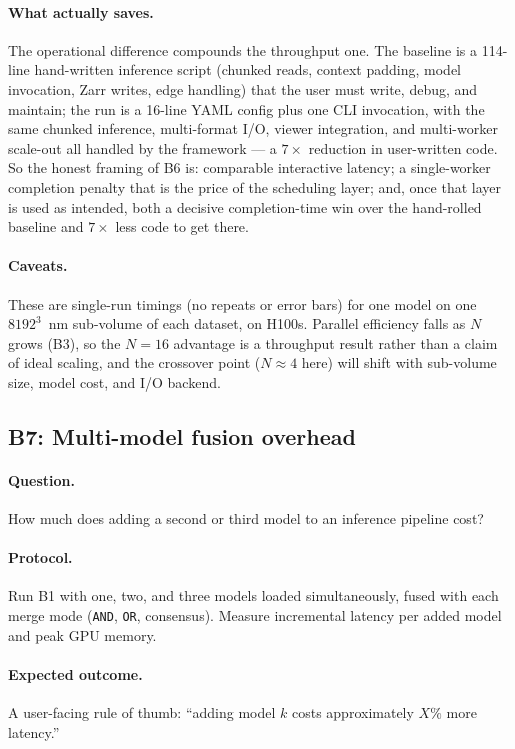 \paragraph{What \cellmapflow{} actually saves.} The operational difference compounds the throughput one. The baseline is a 114-line hand-written inference script (chunked reads, context padding, model invocation, Zarr writes, edge handling) that the user must write, debug, and maintain; the \cellmapflow{} run is a 16-line YAML config plus one CLI invocation, with the same chunked inference, multi-format I/O, viewer integration, and multi-worker scale-out all handled by the framework --- a $7\times$ reduction in user-written code. So the honest framing of B6 is: comparable interactive latency; a single-worker completion penalty that is the price of the scheduling layer; and, once that layer is used as intended, both a decisive completion-time win over the hand-rolled baseline and $7\times$ less code to get there.

\paragraph{Caveats.} These are single-run timings (no repeats or error bars) for one model on one $8192^3$~nm sub-volume of each dataset, on H100s. Parallel efficiency falls as $N$ grows (B3), so the $N{=}16$ advantage is a throughput result rather than a claim of ideal scaling, and the crossover point ($N{\approx}4$ here) will shift with sub-volume size, model cost, and I/O backend.

\subsection*{B7: Multi-model fusion overhead}

\paragraph{Question.} How much does adding a second or third model to an inference pipeline cost?

\paragraph{Protocol.} Run B1 with one, two, and three models loaded simultaneously, fused with each merge mode (\texttt{AND}, \texttt{OR}, consensus). Measure incremental latency per added model and peak GPU memory.

\paragraph{Expected outcome.} A user-facing rule of thumb: ``adding model $k$ costs approximately $X\%$ more latency.''


